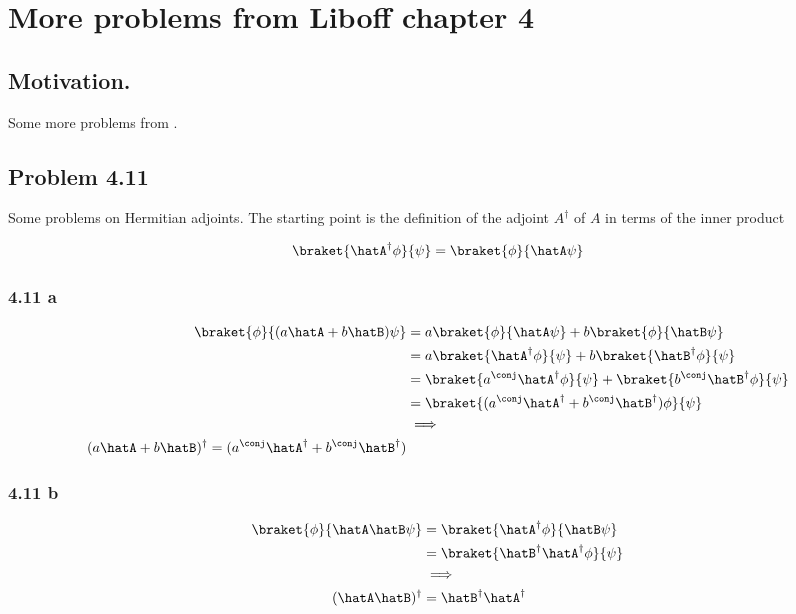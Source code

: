 
%

\chapter{More problems from Liboff chapter 4}
\label{chap:liboff43}
{}
\date{June 25, 2010}

\beginArtNoToc

\section{Motivation.}

Some more problems from \cite{liboff2003iqm}.

\section{Problem 4.11}

Some problems on Hermitian adjoints.  The starting point is the definition of the adjoint $A^\dagger$ of $A$ in terms of the inner product

\begin{align*}
\braket{\hatA^\dagger \phi}{\psi} = \braket{\phi}{\hatA \psi}
\end{align*}

\subsection{ 4.11 a}

\begin{align*}
\braket{ \phi } { (a \hatA + b \hatB) \psi } 
&=
a \braket{ \phi } { \hatA \psi } + b \braket{ \phi } { \hatB \psi }  \\
&=
a \braket{ \hatA^\dagger \phi } { \psi } + b \braket{ \hatB^\dagger \phi } { \psi }  \\
&=
\braket{ a^\conj \hatA^\dagger \phi } { \psi } + \braket{ b^\conj \hatB^\dagger \phi } { \psi }  \\
&=
\braket{ (a^\conj \hatA^\dagger + b^\conj \hatB^\dagger ) \phi } { \psi }  \\
&\implies \\
(a \hatA + b \hatB)^\dagger = (a^\conj \hatA^\dagger + b^\conj \hatB^\dagger)
\end{align*}

\subsection{ 4.11 b}
\begin{align*}
\braket{ \phi } { \hatA \hatB \psi } 
&=
\braket{ \hatA^\dagger \phi } { \hatB \psi }  \\
&=
\braket{ \hatB^\dagger \hatA^\dagger \phi } { \psi }  \\
&\implies \\
(\hatA \hatB )^\dagger &=
\hatB^\dagger \hatA^\dagger 
\end{align*}

